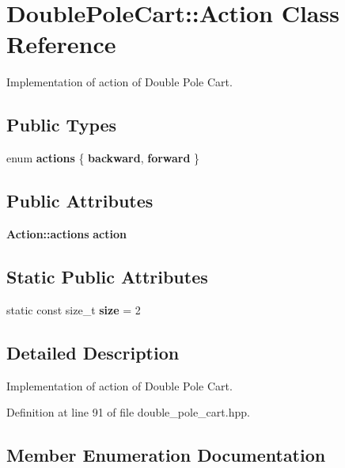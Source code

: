 \section{Double\+Pole\+Cart\+:\+:Action Class Reference}
\label{classmlpack_1_1rl_1_1DoublePoleCart_1_1Action}


Implementation of action of Double Pole Cart.  


\subsection*{Public Types}
\begin{DoxyCompactItemize}
\item 
enum \textbf{ actions} \{ \newline
\textbf{ backward}, 
\newline
\textbf{ forward}
 \}
\end{DoxyCompactItemize}
\subsection*{Public Attributes}
\begin{DoxyCompactItemize}
\item 
\textbf{ Action\+::actions} \textbf{ action}
\end{DoxyCompactItemize}
\subsection*{Static Public Attributes}
\begin{DoxyCompactItemize}
\item 
static const size\+\_\+t \textbf{ size} = 2
\end{DoxyCompactItemize}


\subsection{Detailed Description}
Implementation of action of Double Pole Cart. 

Definition at line 91 of file double\+\_\+pole\+\_\+cart.\+hpp.



\subsection{Member Enumeration Documentation}
\mbox{\label{classmlpack_1_1rl_1_1DoublePoleCart_1_1Action_af806efc6052edbc741683ec893bb2fe1}} 
